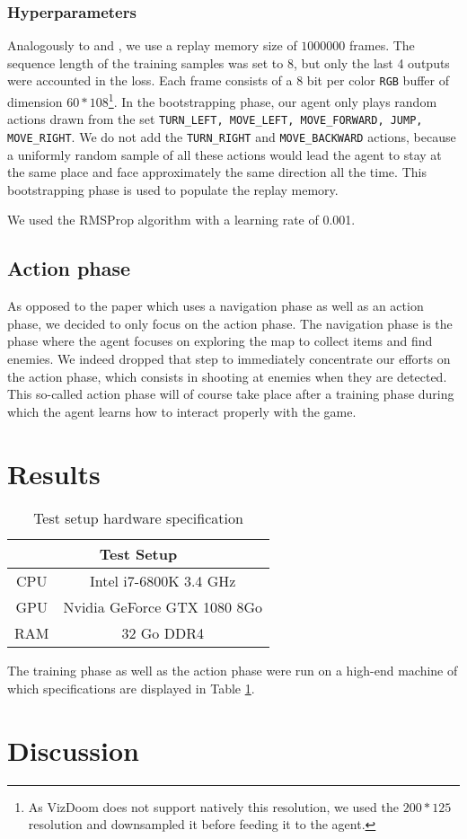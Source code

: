 \documentclass[letterpaper]{article}
\newcommand\Tstrut{\rule{0pt}{2.6ex}}
\begin{document}
\subsubsection{Hyperparameters}
Analogously to \cite{Mnih2015} and \cite{Lample2016}, we use a replay memory
size of $1000000$ frames. The sequence length of
the training samples was set to 8, but only the last 4 outputs were accounted
in the loss.
Each frame consists of a 8 bit per color \texttt{RGB} buffer of dimension
$60 * 108$\footnote{As VizDoom does not support natively this resolution, we
used the $200 * 125$ resolution and downsampled it before feeding it to the
agent.}.
In the bootstrapping phase, our agent only plays random actions drawn from the
set \texttt{TURN\_LEFT, MOVE\_LEFT, MOVE\_FORWARD, JUMP, MOVE\_RIGHT}. We do
not add the \texttt{TURN\_RIGHT} and \texttt{MOVE\_BACKWARD} actions, because
a uniformly random sample of all these actions would lead the agent to stay
at the same place and face approximately the same direction all the time. This
bootstrapping phase is used to populate the replay memory.

We used the RMSProp algorithm with a learning rate of 0.001.

\subsection{Action phase}
As opposed to the paper \citep{Lample2016} which uses a navigation phase as
well as an action phase, we decided to only focus on the action phase. The
navigation phase is the phase where the agent focuses on exploring the map to
collect items and find enemies. We indeed dropped that step to immediately
concentrate our efforts on the action phase, which consists in shooting at
enemies when they are detected. This so-called action phase will of course
take place after a training phase during which the agent learns how to interact
properly with the game.



\section{Results}
\begin{table}[h]
\centering
\begin{tabular}{cc}
\multicolumn{2}{c}{Test Setup}                         \Tstrut\\ \hline
\multicolumn{1}{c|}{CPU} & Intel i7-6800K 3.4 GHz      \Tstrut\\
\multicolumn{1}{c|}{GPU} & Nvidia GeForce GTX 1080 8Go \Tstrut\\
\multicolumn{1}{c|}{RAM} & 32 Go DDR4                      \Tstrut
\end{tabular}
\caption{Test setup hardware specification}
\label{tab:specs}
\end{table}

The training phase as well as the action phase were run on a high-end machine
of which specifications are displayed in Table \ref{tab:specs}.

\section{Discussion}


\footnotesize


\end{document}
